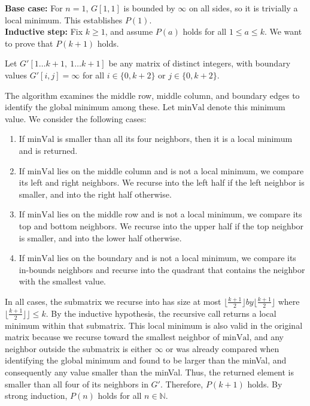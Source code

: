 \begin{parts}
\begin{customsolutionbox}
            \textbf{Base case:} For $n = 1$, $G[1, 1]$ is bounded by $\infty$ on all sides, so it is trivially a local minimum. This establishes $P(1)$. \\
            
            \textbf{Inductive step:} Fix $k \geq 1$, and assume $P(a)$ holds for all $1 \leq a \leq k$. 
            We want to prove that $P(k + 1)$ holds.
            
            Let $G'[1 \ldots k + 1,\ 1 \ldots k + 1]$ be any matrix of distinct integers, with boundary values 
            $G'[i, j] = \infty$ for all $i \in \{0, k + 2\}$ or $j \in \{0, k + 2\}$. 
            
            The algorithm examines the middle row, middle column, and boundary edges to identify the global 
            minimum among these. Let $\text{minVal}$ denote this minimum value. We consider the following cases:
            
            \begin{enumerate}
                \item If $\text{minVal}$ is smaller than all its four neighbors, then it is a local minimum and is returned.
                
                \item If $\text{minVal}$ lies on the middle column and is not a local minimum, we compare its left and right neighbors. 
                We recurse into the left half if the left neighbor is smaller, and into the right half otherwise.
                
                \item If $\text{minVal}$ lies on the middle row and is not a local minimum, we compare its top and bottom neighbors. 
                We recurse into the upper half if the top neighbor is smaller, and into the lower half otherwise.
                
                \item If $\text{minVal}$ lies on the boundary and is not a local minimum, we compare its in-bounds neighbors and recurse 
                into the quadrant that contains the neighbor with the smallest value.
            \end{enumerate}
            
            In all cases, the submatrix we recurse into has size at most $\lfloor \frac{k + 1}{2}\rfloor by  \lfloor \frac{k + 1}{2}\rfloor$
            where $\lfloor \frac{k + 1}{2}\rfloor\rfloor \leq k$. 
            By the inductive hypothesis, the recursive call returns a local minimum within that submatrix. This local minimum is 
            also valid in the original matrix because we recurse toward the smallest neighbor of $\text{minVal}$, 
            and any neighbor outside the submatrix is either $\infty$ or was already compared when identifying the global minimum 
            and found to be larger than the minVal, and consequently any value smaller than the minVal. 
            Thus, the returned element is smaller than all four of its neighbors in $G'$. Therefore, $P(k + 1)$ holds. 
            By strong induction, $P(n)$ holds for all $n \in \mathbb{N}$.


\end{customsolutionbox}
\end{parts}
